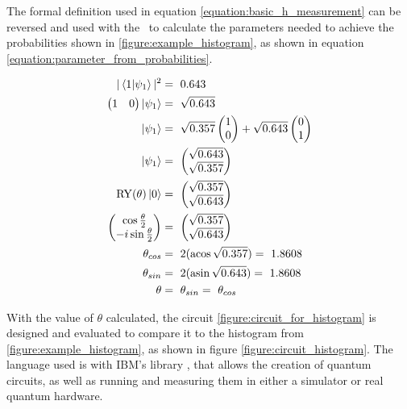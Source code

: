The formal definition used in equation \ref{equation:basic_h_measurement} can be reversed and used with the \rygate\ to calculate the parameters needed to achieve the probabilities shown in \ref{figure:example_histogram}, as shown in equation \ref{equation:parameter_from_probabilities}. 

\begin{equation}
    \centering
    \begin{split}
        |\bra{1}\ket{\psi_1}|^2 &=\ 0.643 \\
        \begin{pmatrix}1 & 0\end{pmatrix}\ket{\psi_1} &=\ \sqrt{0.643} \\
        \ket{\psi_1} &=\ \sqrt{0.357}\begin{pmatrix} 1 \\ 0\end{pmatrix} + \sqrt{0.643}\begin{pmatrix} 0 \\ 1\end{pmatrix}\\
        \ket{\psi_1} &=\ \begin{pmatrix}\sqrt{0.643}\\ \sqrt{0.357}\end{pmatrix}\\
        \mathrm{RY}(\theta)\ket{0} &=\ \begin{pmatrix}\sqrt{0.357}\\ \sqrt{0.643}\end{pmatrix} \\
        \begin{pmatrix}\cos{\frac{\theta}{2}} \\ -i\sin{\frac{\theta}{2}}\end{pmatrix} &=\ \begin{pmatrix}\sqrt{0.357}\\ \sqrt{0.643}\end{pmatrix}\\
        \theta_{cos} &=\ 2(\acos{\sqrt{0.357}}) =\ 1.8608\\
        \theta_{sin} &=\ 2(\asin{\sqrt{0.643}}) =\ 1.8608\\
        \theta &=\ \theta_{sin} =\ \theta_{cos}\\
    \end{split}
    \label{equation:parameter_from_probabilities}
\end{equation}

With the value of $\theta$ calculated, the circuit \ref{figure:circuit_for_histogram} is designed and evaluated to compare it to the histogram from \ref{figure:example_histogram}, as shown in figure \ref{figure:circuit_histogram}. The language used is  with IBM's library \cite{qiskit_qiskit_nodate}, that allows the creation of quantum circuits, as well as running and measuring them in either a simulator or real quantum hardware.



